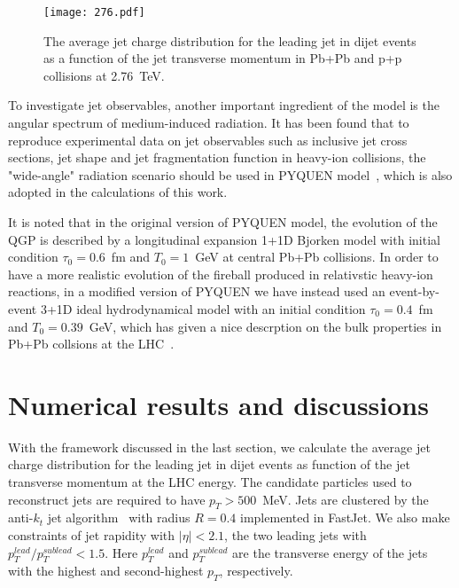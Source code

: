 \documentclass[3p,times,twocolumn]{elsarticle}
\begin{document}
\begin{figure}[!htb]
\centerline{
\texttt{[image: 276.pdf]}
}
\caption{The average jet charge distribution for the leading jet
in dijet events as a function of the jet transverse momentum in Pb+Pb and p+p collisions at 2.76~TeV.}
\label{fig:2.76}
\end{figure}
To investigate jet observables, another important ingredient of the model is the angular spectrum of medium-induced
radiation. It has been found that to reproduce experimental data on
jet observables such as inclusive jet cross sections, jet shape and jet fragmentation function in heavy-ion collisions, the "wide-angle" radiation scenario should be used in PYQUEN model~\cite{Lokhtin:2014vda}, which is also adopted in the calculations of this work.


It is noted that in the original version of PYQUEN model, the evolution of the QGP is described by a longitudinal expansion 1+1D Bjorken model with initial condition $\tau_{0} = 0.6$~fm and $T_{0} = 1$~GeV at central Pb+Pb collisions. In order to have a more realistic evolution of the fireball produced in relativstic heavy-ion reactions, in a modified version of PYQUEN we have instead used an event-by-event 3+1D ideal hydrodynamical model with an initial condition $\tau_{0} = 0.4$~fm and $T_{0} = 0.39$~GeV,  which has given a nice descrption on the bulk properties in Pb+Pb collsions at the LHC~\cite{Pang:2012he}.



\section{Numerical results and discussions}
\label{sec:results}
With the framework discussed in the last section, we calculate the average jet charge distribution for the leading jet
in dijet events as function of the jet transverse momentum at the LHC energy. The candidate particles used to reconstruct jets
are required to have $p_{T}>500$~MeV.
Jets are clustered by the anti-$k_{t}$ jet algorithm~\cite{Cacciari:2008gp} with radius  $R=0.4$ implemented in
FastJet. We also make constraints of jet rapidity with $|\eta|<2.1$, the two leading jets with $p^{lead}_{T}/p^{sublead}_{T}<1.5$. Here $p^{lead}_{T}$ and $p^{sublead}_{T}$ are the transverse energy of the jets with the highest and second-highest $p_{T}$, respectively.
\end{document}
